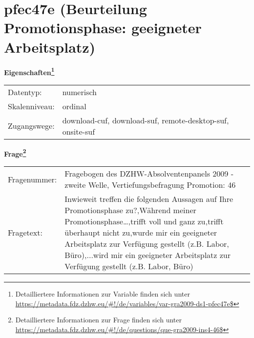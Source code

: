
    \setcounter{footnote}{0}

    \vspace*{-1.8cm}
	\section{pfec47e (Beurteilung Promotionsphase: geeigneter Arbeitsplatz)}
	\label{section:pfec47e}



    \vspace*{0.5cm}
    \noindent\textbf{Eigenschaften\footnote{Detailliertere Informationen zur Variable finden sich unter
		\url{https://metadata.fdz.dzhw.eu/\#!/de/variables/var-gra2009-ds1-pfec47e$}}}\\
	\begin{tabularx}{\hsize}{@{}lX}
	Datentyp: & numerisch \\
	Skalenniveau: & ordinal \\
	Zugangswege: &
	  download-cuf, 
	  download-suf, 
	  remote-desktop-suf, 
	  onsite-suf
 \\
    \end{tabularx}



				\vspace*{0.5cm}
                \noindent\textbf{Frage\footnote{Detailliertere Informationen zur Frage finden sich unter
		              \url{https://metadata.fdz.dzhw.eu/\#!/de/questions/que-gra2009-ins4-46$}}}\\
				\begin{tabularx}{\hsize}{@{}lX}
					Fragenummer: &
					  Fragebogen des DZHW-Absolventenpanels 2009 - zweite Welle, Vertiefungsbefragung Promotion:
					  46
 \\
					Fragetext: & Inwieweit treffen die folgenden Aussagen auf Ihre Promotionsphase zu?,Während meiner Promotionsphase…,trifft voll und ganz zu,trifft überhaupt nicht zu,wurde mir ein geeigneter Arbeitsplatz zur Verfügung gestellt (z.B. Labor, Büro),...wird mir ein geeigneter Arbeitsplatz zur Verfügung gestellt (z.B. Labor, Büro) \\
				\end{tabularx}





